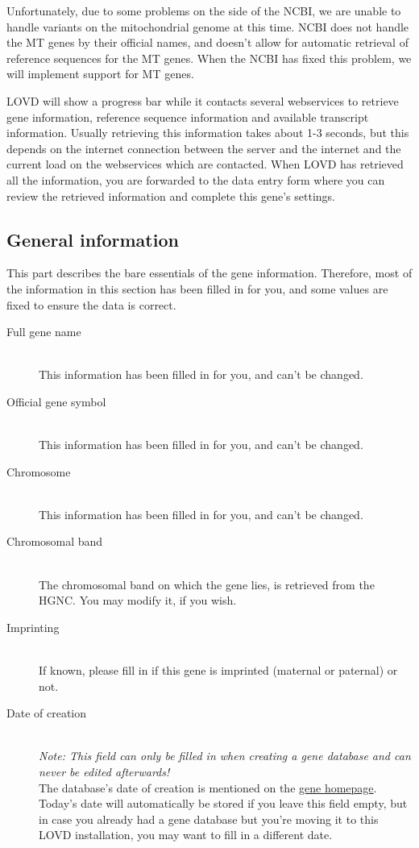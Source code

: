 \begin{infotable}
Unfortunately, due to some problems on the side of the NCBI, we are unable to handle variants on the mitochondrial genome at this time.
NCBI does not handle the MT genes by their official names, and doesn't allow for automatic retrieval of reference sequences for the MT genes.
When the NCBI has fixed this problem, we will implement support for MT genes.
\end{infotable}

LOVD will show a progress bar while it contacts several webservices to retrieve gene information,
 reference sequence information and available transcript information.
Usually retrieving this information takes about 1-3 seconds, but this depends on the internet connection between
the server and the internet and the current load on the webservices which are contacted.
When LOVD has retrieved all the information, you are forwarded to the data entry form where
 you can review the retrieved information and complete this gene's settings.



\pagebreak[4] %
\subsection{General information}
This part describes the bare essentials of the gene information.
Therefore, most of the information in this section has been filled in for you, and some values are fixed to ensure the data is correct.
\begin{description}
  \item[Full gene name] \hfill \\
  This information has been filled in for you, and can't be changed.
  \item[Official gene symbol] \hfill \\
  This information has been filled in for you, and can't be changed.
  \item[Chromosome] \hfill \\
  This information has been filled in for you, and can't be changed.
  \item[Chromosomal band] \hfill \\
  The chromosomal band on which the gene lies, is retrieved from the HGNC.
  You may modify it, if you wish.
  \item[Imprinting] \hfill \\
  If known, please fill in if this gene is imprinted (maternal or paternal) or not.
  \item[Date of creation] \hfill \\
  \emph{Note: This field can only be filled in when creating a gene database and can never be edited afterwards!}
  \\
  The database's date of creation is mentioned on the \hyperlink{sec:gene_homepage}{gene homepage}.
  Today's date will automatically be stored if you leave this field empty, but in case you already
   had a gene database but you're moving it to this LOVD installation, you may want to fill in a different date.
\end{description}



